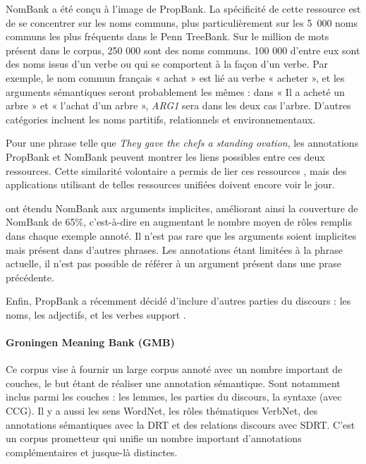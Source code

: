 NomBank \citep{meyers2004nombank} a été conçu à l'image de PropBank. La
spécificité de cette ressource est de se concentrer sur les noms communs, plus
particulièrement sur les 5~000 noms communs les plus fréquents dans le Penn
TreeBank. Sur le million de mots présent dans le corpus, 250 000 sont des noms
communs. 100 000 d'entre eux sont des noms issus d'un verbe ou qui se
comportent à la façon d'un verbe. Par exemple, le nom commun français « achat »
est lié au verbe « acheter », et les arguments sémantiques seront probablement
les mêmes : dans « Il a acheté un arbre » et « l'achat d'un arbre »,
\textit{ARG1} sera dans les deux cas l'arbre. D'autres catégories incluent les
noms partitifs, relationnels et environnementaux.

Pour une phrase telle que \emph{They gave the chefs a standing ovation}, les
annotations PropBank et NomBank peuvent montrer les liens possibles entre ces
deux ressources. Cette similarité volontaire a permis de lier ces ressources
\citep{pustejovsky2005merging,verhagen2007combining}, mais des applications
utilisant de telles ressources unifiées doivent encore voir le jour.

\cite{gerber2010beyond} ont étendu NomBank aux arguments
implicites, améliorant ainsi la couverture de NomBank de 65\%, c'est-à-dire en
augmentant le nombre moyen de rôles remplis dans chaque exemple annoté. Il
n'est pas rare que les arguments soient implicites mais présent dans d'autres
phrases. Les annotations étant limitées à la phrase actuelle, il n'est pas
possible de référer à un argument présent dans une prase précédente.

Enfin, PropBank a récemment décidé d'inclure d'autres parties du discours : les
noms, les adjectifs, et les verbes support \citep{bonial2014propbank}.

\paragraph{Groningen Meaning Bank (GMB)}

Ce corpus \citep{basile2014developing} vise à fournir un large corpus annoté
avec un nombre important de couches, le but étant de réaliser une annotation
sémantique. Sont notamment inclus parmi les couches : les lemmes, les parties
du discours, la syntaxe (avec CCG). Il y a aussi les sens WordNet, les rôles
thématiques VerbNet, des annotations sémantiques avec la DRT et des relations
discours avec SDRT. C'est un corpus prometteur qui unifie un nombre important
d'annotations complémentaires et jusque-là distinctes.


